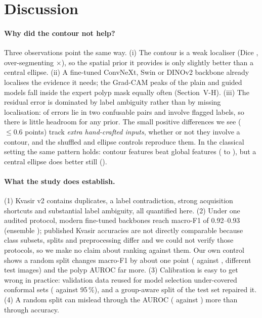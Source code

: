 \section{Discussion}
\paragraph{Why did the contour not help?}
Three observations point the same way. (i) The contour is a weak localiser (Dice \acDice{}, over-segmenting \acOverSeg{}$\times$), so the spatial prior it provides is only slightly better than a central ellipse.
(ii) A fine-tuned ConvNeXt, Swin or DINOv2 backbone already localises the evidence it needs; the Grad-CAM peaks of the plain and guided models fall inside the expert polyp mask equally often (Section~V-H).
(iii) The residual error is dominated by label ambiguity rather than by missing localisation: \errPairs{} of errors lie in two confusable pairs and \errFlagged{} involve flagged labels, so there is little headroom for any prior.
The small positive differences we see ($\le0.6$ points) track \emph{extra hand-crafted inputs}, whether or not they involve a contour, and the shuffled and ellipse controls reproduce them.
In the classical setting the same pattern holds: contour features beat global features (\lgbGF{} to \lgbGACF{}), but a central ellipse does better still (\lgbGEllF{}).

\paragraph{What the study does establish.}
(1) Kvasir v2 contains duplicates, a label contradiction, strong acquisition shortcuts and substantial label ambiguity, all quantified here.
(2) Under one audited protocol, modern fine-tuned backbones reach macro-F1 of 0.92--0.93 (ensemble \ensF{}); published Kvasir accuracies are not directly comparable because class subsets, splits and preprocessing differ and we could not verify those protocols, so we make no claim about ranking against them. Our own control shows a random split changes macro-F1 by about one point (\randsplitF{} against \plainF{}, different test images) and the polyp AUROC far more.
(3) Calibration is easy to get wrong in practice: validation data reused for model selection under-covered conformal sets (\confCovVal{} against 95\,\%), and a group-aware split of the test set repaired it.
(4) A random split can mislead through the AUROC (\randsplitAU{} against \plainAU{}) more than through accuracy.

